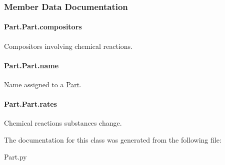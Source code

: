 \subsubsection{Member Data Documentation}
\paragraph[{\texorpdfstring{compositors}{compositors}}]{\setlength{\rightskip}{0pt plus 5cm}Part.\+Part.\+compositors}\hypertarget{classPart_1_1Part_a5b12b62fe1ad5a2a2a98fa631659992b}{}\label{classPart_1_1Part_a5b12b62fe1ad5a2a2a98fa631659992b}


Compositors involving chemical reactions. 

\paragraph[{\texorpdfstring{name}{name}}]{\setlength{\rightskip}{0pt plus 5cm}Part.\+Part.\+name}\hypertarget{classPart_1_1Part_aa6357537859dfbc7c08863a542bd1282}{}\label{classPart_1_1Part_aa6357537859dfbc7c08863a542bd1282}


Name assigned to a \hyperlink{classPart_1_1Part}{Part}. 

\paragraph[{\texorpdfstring{rates}{rates}}]{\setlength{\rightskip}{0pt plus 5cm}Part.\+Part.\+rates}\hypertarget{classPart_1_1Part_a3cf6cc7f4a7940f3a4a8bb238fee7509}{}\label{classPart_1_1Part_a3cf6cc7f4a7940f3a4a8bb238fee7509}


Chemical reactions substances change. 



The documentation for this class was generated from the following file\+:\begin{DoxyCompactItemize}
\item 
Part.\+py\end{DoxyCompactItemize}
